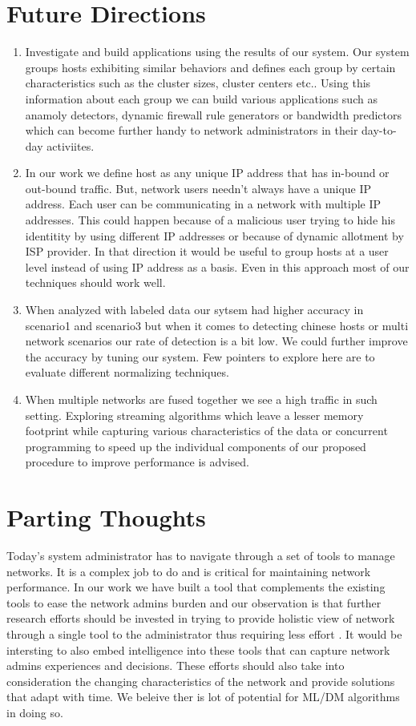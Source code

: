 \section{Future Directions}

\begin{enumerate}
	\item Investigate and build applications using the results of our system. Our system groups hosts exhibiting similar behaviors and defines each group by certain characteristics such as the cluster sizes, cluster centers etc.. Using this information about each group we can build various applications such as anamoly detectors, dynamic firewall rule generators or bandwidth predictors which can become further handy to network administrators in their day-to-day activiites.
	
	\item In our work we define host as any unique IP address that has in-bound or out-bound traffic. But, network users needn't always have a unique IP address. Each user can be communicating in a network with multiple IP addresses. This could happen because of a malicious user trying to hide his identitity by using different IP addresses or because of dynamic allotment by ISP provider. In that direction it would be useful to group hosts at a user level instead of using IP address as a basis. Even in this approach most of our techniques should work well. 
	
	\item When analyzed with labeled data our sytsem had higher accuracy in scenario1 and scenario3 but when it comes to detecting chinese hosts or multi network scenarios our rate of detection is a bit low. We could further improve the accuracy by tuning our system. Few pointers to explore here are to evaluate different normalizing techniques.
	
	\item When multiple networks are fused together we see a high  traffic in such setting. Exploring streaming algorithms \cite{} which leave a lesser memory footprint while capturing various characteristics of the data or  concurrent programming to speed up the individual components of our proposed procedure to improve performance is advised.
\end{enumerate}


\section{Parting Thoughts}
Today's system administrator has to navigate through a set of tools to manage networks. It is a complex job to do and is critical for maintaining network performance. In our work we have built a tool that complements the existing tools to ease the network admins burden and our observation is that further research efforts should be invested in trying to provide holistic view of network through a single tool to the administrator thus requiring less effort . It would be intersting to also embed intelligence into these tools that can capture network admins experiences and decisions. These efforts should also take into consideration the changing characteristics of the network and provide solutions that adapt with time. We beleive ther is lot of potential for ML/DM algorithms in doing so.
